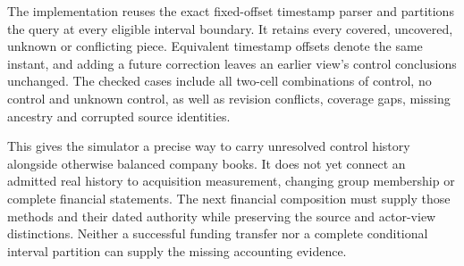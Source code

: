The implementation reuses the exact fixed-offset timestamp parser and partitions
the query at every eligible interval boundary. It retains every covered,
uncovered, unknown or conflicting piece. Equivalent timestamp offsets denote
the same instant, and adding a future correction leaves an earlier view's
control conclusions unchanged. The checked cases include all two-cell combinations
of control, no control and unknown control, as well as revision conflicts,
coverage gaps, missing ancestry and corrupted source identities.

This gives the simulator a precise way to carry unresolved control history
alongside otherwise balanced company books. It does not yet connect an admitted
real history to acquisition measurement, changing group membership or complete
financial statements. The next financial composition must supply those methods
and their dated authority while preserving the source and actor-view distinctions.
Neither a successful funding transfer nor a complete conditional interval
partition can supply the missing accounting evidence.

